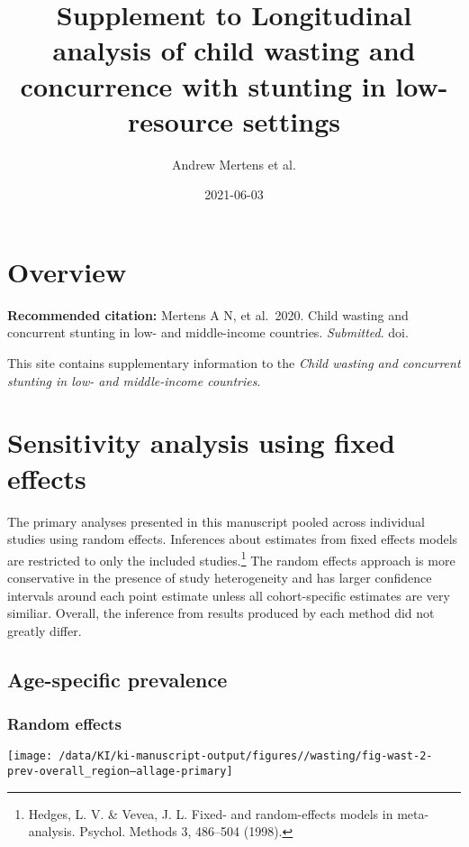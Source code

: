 \documentclass[
  9pt,
]{book}
\title{Supplement to Longitudinal analysis of child wasting and concurrence with stunting in low-resource settings}
\author{Andrew Mertens et al.}
\date{2021-06-03}
\begin{document}
\maketitle

{
\setcounter{tocdepth}{1}
\tableofcontents
}
\hypertarget{overview}{%
\chapter{Overview}\label{overview}}

\textbf{Recommended citation:} Mertens A N, et al.~2020. Child wasting and concurrent stunting in low- and middle-income countries. \emph{Submitted}. doi.

This site contains supplementary information to the \emph{Child wasting and concurrent stunting in low- and middle-income countries}.

\hypertarget{fixed-effects}{%
\chapter{Sensitivity analysis using fixed effects}\label{fixed-effects}}

\raggedright

The primary analyses presented in this manuscript pooled across individual studies using random effects. Inferences about estimates from fixed effects models are restricted to only the included studies.\footnote{Hedges, L. V. \& Vevea, J. L. Fixed- and random-effects models in meta-analysis. Psychol. Methods 3, 486--504 (1998).} The random effects approach is more conservative in the presence of study heterogeneity and has larger confidence intervals around each point estimate unless all cohort-specific estimates are very similiar. Overall, the inference from results produced by each method did not greatly differ.

\hypertarget{age-specific-prevalence}{%
\section{Age-specific prevalence}\label{age-specific-prevalence}}

\hypertarget{random-effects}{%
\subsection{Random effects}\label{random-effects}}

\texttt{[image: /data/KI/ki-manuscript-output/figures//wasting/fig-wast-2-prev-overall\_region--allage-primary]}
\end{document}
